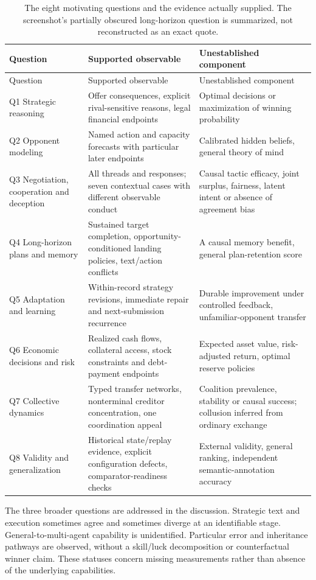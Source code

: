 \begin{longtable}{L{3.1cm}L{5.2cm}L{6.2cm}}
\caption{The eight motivating questions and the evidence actually supplied. The screenshot's partially obscured long-horizon question is summarized, not reconstructed as an exact quote.}\\
\toprule Question & Supported observable & Unestablished component\\\midrule\endfirsthead
\toprule Question & Supported observable & Unestablished component\\\midrule\endhead
Q1 Strategic reasoning & Offer consequences, explicit rival-sensitive reasons, legal financial endpoints & Optimal decisions or maximization of winning probability\\
Q2 Opponent modeling & Named action and capacity forecasts with particular later endpoints & Calibrated hidden beliefs, general theory of mind\\
Q3 Negotiation, cooperation and deception & All threads and responses; seven contextual cases with different observable conduct & Causal tactic efficacy, joint surplus, fairness, latent intent or absence of agreement bias\\
Q4 Long-horizon plans and memory & Sustained target completion, opportunity-conditioned landing policies, text/action conflicts & A causal memory benefit, general plan-retention score\\
Q5 Adaptation and learning & Within-record strategy revisions, immediate repair and next-submission recurrence & Durable improvement under controlled feedback, unfamiliar-opponent transfer\\
Q6 Economic decisions and risk & Realized cash flows, collateral access, stock constraints and debt-payment endpoints & Expected asset value, risk-adjusted return, optimal reserve policies\\
Q7 Collective dynamics & Typed transfer networks, nonterminal creditor concentration, one coordination appeal & Coalition prevalence, stability or causal success; collusion inferred from ordinary exchange\\
Q8 Validity and generalization & Historical state/replay evidence, explicit configuration defects, comparator-readiness checks & External validity, general ranking, independent semantic-annotation accuracy\\\bottomrule
\end{longtable}

The three broader questions are addressed in the discussion. Strategic text and execution sometimes agree and sometimes diverge at an identifiable stage. General-to-multi-agent capability is unidentified. Particular error and inheritance pathways are observed, without a skill/luck decomposition or counterfactual winner claim. These statuses concern missing measurements rather than absence of the underlying capabilities.

